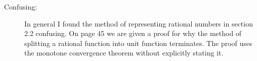 \documentclass[12pt]{article}
\theoremstyle{homework}
\begin{document}
\begin{description}
\item[Confusing:] In general I found the method of representing rational numbers in section 2.2 confusing. On page 45 we are given a proof for why the method of splitting a rational function into unit function terminates. 
The proof uses the monotone convergence theorem without explicitly stating it. 


\end{description}
\end{document}
